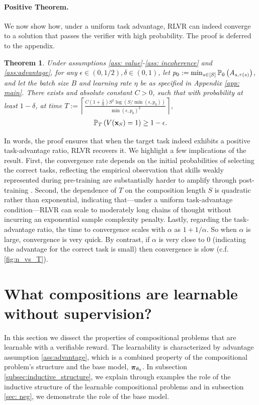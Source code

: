 \documentclass{article}
\theoremstyle{plain}
\newtheorem{theorem}{Theorem}[section]
\theoremstyle{definition}
\theoremstyle{remark}
\begin{document}
\paragraph{Positive Theorem. }
We now show how, under a uniform task advantage, RLVR can indeed converge to a solution that passes the verifier with high probability. The proof is deferred to the appendix.
\begin{theorem}\label{thm: pos_main}
    Under assumptions \ref{ass: value}-\ref{ass: incoherence} and \cref{ass:advantage}, for any $\epsilon \in (0, 1/2), \delta \in (0,1)$, let $p_0:=\min_{s \in [S]} \P_0\left(A_{s,\tau(s)}\right)$, and let the batch size $B$ and learning rate $\eta$ be as specified in Appendix \ref{app: main}.
    There exists and absolute constant $C>0$, such that with probability at least $1-\delta$, at time $T := \left \lceil \frac{C \left(1+\frac{1}{\alpha}\right) S^2 \log\left(S / \min(\epsilon, p_0)\right)}{ \min(\epsilon, p_0)^2 } \right\rceil$, 
    \begin{align*}
        \P_T\left(V(\bx_S)=1\right) \geq 1-\epsilon.
    \end{align*}
\end{theorem}

In words, the proof ensures that when the target task indeed exhibits a positive task-advantage ratio, RLVR recovers it. We highlight a few implications of the result. First, the convergence rate depends on the initial probabilities of selecting the correct tasks, reflecting the empirical observation that skills weakly represented during pre-training are substantially harder to amplify through post-training \citep{yue2025does, wu2025invisible}. Second, the dependence of $T$ on the composition length $S$ is quadratic rather than exponential, indicating that—under a uniform task-advantage condition—RLVR can scale to moderately long chains of thought without incurring an exponential sample complexity penalty. Lastly, regarding the task-advantage ratio, the time to convergence scales with $\alpha$ as $1 + 1/\alpha$. So when $\alpha$ is large, convergence is very quick. By contrast, if $\alpha$ is very close to $0$ (indicating the advantage for the correct task is small) then convergence is slow (c.f. \cref{fig:n_vs_T}).


\section{What compositions are learnable without supervision?}\label{sec: examples}
In this section we dissect the properties of compositional problems that are learnable with a verifiable reward. The learnability is characterized by advantage assumption \ref{ass:advantage}, which is a combined property of the compositional problem's structure and the base model, $\bpi_{\theta_0}$. 
In subsection \ref{subsec:inductive_structure}, we explain through examples the role of the inductive structure of the learnable compositional problems and in subsection \ref{sec: neg}, we demonstrate the role of the base model. 
\end{document}
